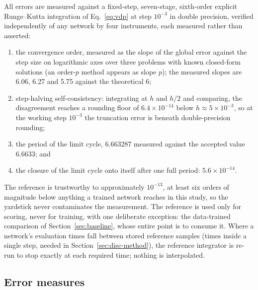 \documentclass[11pt,a4paper]{article}
\begin{document}
All errors are measured against a fixed-step, seven-stage, sixth-order
explicit Runge--Kutta integration of Eq.~\eqref{eq:vdp} at step
$10^{-3}$ in double precision, verified independently of any network by
four instruments, each measured rather than asserted:
\begin{enumerate}
  \item the convergence order, measured as the slope of the global error
  against the step size on logarithmic axes over three problems with known
  closed-form solutions (an order-$p$ method appears as slope $p$); the
  measured slopes are 6.06, 6.27 and 5.75 against the theoretical 6;
  \item step-halving self-consistency: integrating at $h$ and $h/2$ and
  comparing, the disagreement reaches a rounding floor of
  $6.4\times10^{-14}$ below $h \approx 5\times10^{-3}$, so at the working
  step $10^{-3}$ the truncation error is beneath double-precision
  rounding;
  \item the period of the limit cycle, $6.663287$ measured against the
  accepted value $6.6633$; and
  \item the closure of the limit cycle onto itself after one full period:
  $5.6\times10^{-14}$.
\end{enumerate}
The reference is trustworthy to approximately $10^{-13}$, at least six
orders of magnitude below anything a trained network reaches in this
study, so the yardstick never contaminates the measurement. The reference
is used only for scoring, never for training, with one deliberate
exception: the data-trained comparison of Section~\ref{sec:baseline},
whose entire point is to consume it. Where a network's evaluation times
fall between stored reference samples (times inside a single step, needed
in Section~\ref{sec:disc-method}), the reference integrator is re-run to
stop exactly at each required time; nothing is interpolated.

\subsection{Error measures}
\label{sec:metrics}
\end{document}
